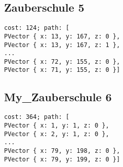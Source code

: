 \subsection{Zauberschule 5}

\begin{verbatim}
cost: 124; path: [
PVector { x: 13, y: 167, z: 0 },
PVector { x: 13, y: 167, z: 1 },
...
PVector { x: 72, y: 155, z: 0 },
PVector { x: 71, y: 155, z: 0 }]
\end{verbatim}

\subsection{My\_Zauberschule 6}

\begin{verbatim}
cost: 364; path: [
PVector { x: 1, y: 1, z: 0 },
PVector { x: 2, y: 1, z: 0 },
...
PVector { x: 79, y: 198, z: 0 },
PVector { x: 79, y: 199, z: 0 }]
\end{verbatim}
